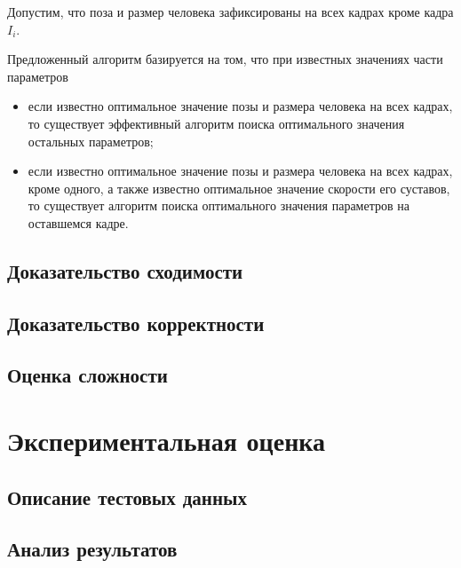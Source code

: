 Допустим, что поза и размер человека зафиксированы на всех кадрах кроме кадра $I_i$.

Предложенный алгоритм базируется на том, что при известных значениях части параметров
\begin{itemize}
	\item если известно оптимальное значение позы и размера человека на всех кадрах, то существует эффективный алгоритм поиска оптимального значения остальных параметров;
	\item если известно оптимальное значение позы и размера человека на всех кадрах, кроме одного, а также известно оптимальное значение скорости его суставов, то существует алгоритм поиска оптимального значения параметров на оставшемся кадре.
\end{itemize}

\subsection{Доказательство сходимости}
\subsection{Доказательство корректности}
\subsection{Оценка сложности}
\section{Экспериментальная оценка}
\subsection{Описание тестовых данных}
\subsection{Анализ результатов}
